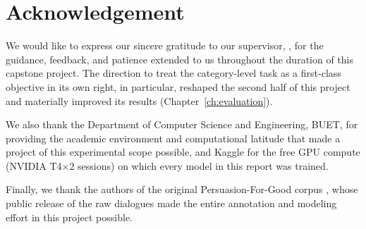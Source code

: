 \chapter*{Acknowledgement}

We would like to express our sincere gratitude to our supervisor,
\Supervisors, for the guidance, feedback, and patience extended to us
throughout the duration of this capstone project. The direction to treat the
category-level task as a first-class objective in its own right, in
particular, reshaped the second half of this project and materially improved
its results (Chapter~\ref{ch:evaluation}).

We also thank the Department of Computer Science and Engineering, BUET, for
providing the academic environment and computational latitude that made a
project of this experimental scope possible, and Kaggle for the free GPU
compute (NVIDIA T4$\times$2 sessions) on which every model in this report was
trained.

Finally, we thank the authors of the original Persuasion-For-Good corpus
\citep{wang2019persuasion}, whose public release of the raw dialogues made
the entire annotation and modeling effort in this project possible.
